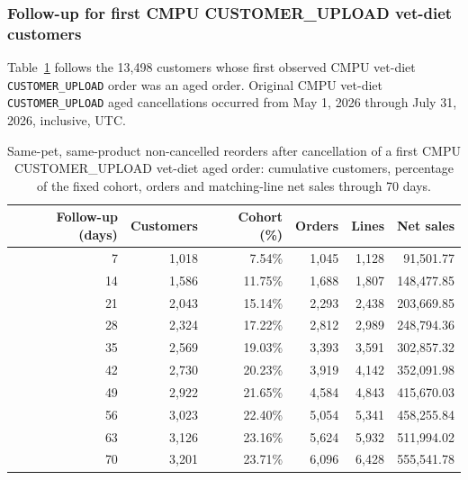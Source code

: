 \clearpage
\subsubsection{Follow-up for first CMPU CUSTOMER\_UPLOAD vet-diet customers}
Table~\ref{tab:financial-opportunity-new-upload-follow-up} follows the
13,498 customers whose first observed CMPU vet-diet
\texttt{CUSTOMER\_UPLOAD} order was an aged order. Original CMPU vet-diet
\texttt{CUSTOMER\_UPLOAD} aged cancellations occurred from
May 1, 2026 through July 31, 2026, inclusive, UTC.

\begin{table}[!htbp]
\centering
\caption{Same-pet, same-product non-cancelled reorders after cancellation of a first CMPU CUSTOMER\_UPLOAD vet-diet aged order: cumulative customers, percentage of the fixed cohort, orders and matching-line net sales through 70 days.}
\label{tab:financial-opportunity-new-upload-follow-up}
\begin{tabular}{@{}rrrrrr@{}}
\toprule
Follow-up (days) & Customers & Cohort (\%) & Orders & Lines & Net sales \\
\midrule
7 & 1,018 & 7.54\% & 1,045 & 1,128 & 91,501.77 \\
14 & 1,586 & 11.75\% & 1,688 & 1,807 & 148,477.85 \\
21 & 2,043 & 15.14\% & 2,293 & 2,438 & 203,669.85 \\
28 & 2,324 & 17.22\% & 2,812 & 2,989 & 248,794.36 \\
35 & 2,569 & 19.03\% & 3,393 & 3,591 & 302,857.32 \\
42 & 2,730 & 20.23\% & 3,919 & 4,142 & 352,091.98 \\
49 & 2,922 & 21.65\% & 4,584 & 4,843 & 415,670.03 \\
56 & 3,023 & 22.40\% & 5,054 & 5,341 & 458,255.84 \\
63 & 3,126 & 23.16\% & 5,624 & 5,932 & 511,994.02 \\
70 & 3,201 & 23.71\% & 6,096 & 6,428 & 555,541.78 \\
\bottomrule
\end{tabular}


\end{table}
